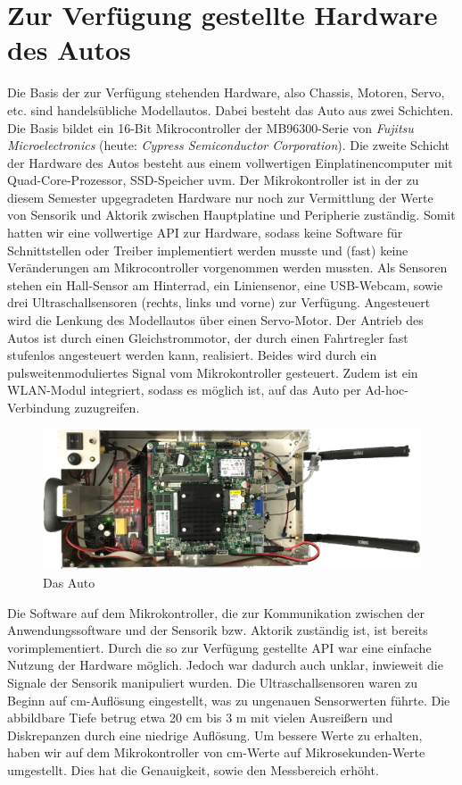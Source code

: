 \section{Zur Verfügung gestellte Hardware des Autos}
\label{sec:grundlegendesHW}

Die Basis der zur Verfügung stehenden Hardware, also Chassis, Motoren, Servo, etc. sind handelsübliche Modellautos. Dabei besteht das Auto aus zwei Schichten. Die Basis bildet ein 16-Bit Mikrocontroller der MB96300-Serie von \textit{Fujitsu Microelectronics} (heute: \textit{Cypress Semiconductor Corporation}). Die zweite Schicht der Hardware des Autos besteht aus einem vollwertigen Einplatinencomputer mit Quad-Core-Prozessor, SSD-Speicher uvm. Der Mikrokontroller ist in der zu diesem Semester upgegradeten Hardware nur noch zur Vermittlung der Werte von Sensorik und Aktorik zwischen Hauptplatine und Peripherie zuständig. Somit hatten wir eine vollwertige API zur Hardware, sodass keine Software für Schnittstellen oder Treiber implementiert werden musste und (fast) keine Veränderungen am Mikrocontroller vorgenommen werden mussten. Als Sensoren stehen ein Hall-Sensor am Hinterrad, ein Liniensenor, eine USB-Webcam, sowie drei Ultraschallsensoren (rechts, links und vorne) zur Verfügung. Angesteuert wird die Lenkung des Modellautos über einen Servo-Motor. Der Antrieb des Autos ist durch einen Gleichstrommotor, der durch einen Fahrtregler fast stufenlos angesteuert werden kann, realisiert. Beides wird durch ein pulsweitenmoduliertes Signal vom Mikrokontroller gesteuert. Zudem ist ein WLAN-Modul integriert, sodass es möglich ist, auf das Auto per Ad-hoc-Verbindung zuzugreifen. 

\begin{figure}[htbp] 
	\centering
	\includegraphics[width=350pt]{images/Animauto.jpg}
	\caption{Das Auto}
	\label{fig:DasAuto}
\end{figure}

Die Software auf dem Mikrokontroller, die zur Kommunikation zwischen der Anwendungssoftware und der Sensorik bzw. Aktorik zuständig ist, ist bereits vorimplementiert. Durch die so zur Verfügung gestellte API war eine einfache Nutzung der Hardware möglich. Jedoch war dadurch auch unklar, inwieweit die Signale der Sensorik manipuliert wurden. Die Ultraschallsensoren waren zu Beginn auf cm-Auflösung eingestellt, was zu ungenauen Sensorwerten führte. Die abbildbare Tiefe betrug etwa 20 cm bis 3 m mit vielen Ausreißern und Diskrepanzen durch eine niedrige Auflösung. Um bessere Werte zu erhalten, haben wir auf dem Mikrokontroller von cm-Werte auf Mikrosekunden-Werte umgestellt. Dies hat die Genauigkeit, sowie den Messbereich erhöht.